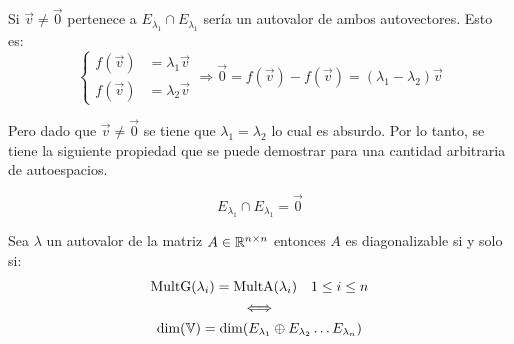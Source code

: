 Si $\Vec{v} \neq \Vec{0}$ pertenece a $E_{\lambda_1} \cap E_{\lambda_1}$ sería un autovalor de ambos autovectores.
Esto es:
\begin{equation*}
    \left\{
    \begin{aligned}
        f(\Vec{v}) &= \lambda_1 \Vec{v}
        \\
        f(\Vec{v}) &= \lambda_2 \Vec{v}
    \end{aligned}
    \right.
    \Rightarrow \Vec{0} = f(\Vec{v}) - f(\Vec{v}) = \left( \lambda_1-\lambda_2 \right) \Vec{v}
\end{equation*}

Pero dado que $\Vec{v}\neq\Vec{0}$ se tiene que $\lambda_1=\lambda_2$ lo cual es absurdo.
Por lo tanto, se tiene la siguiente propiedad que se puede demostrar para una cantidad arbitraria de autoespacios.

\begin{mdframed}[style=PropertyFrame]
    \begin{prop}
    \end{prop}
    \begin{equation*}
        E_{\lambda_1} \cap E_{\lambda_1} = \Vec{0}
    \end{equation*}
\end{mdframed}

\begin{mdframed}[style=PropertyFrame]
    \begin{prop}
    \end{prop}
    Sea $\lambda$ un autovalor de la matriz $A\in\mathbb{R}^{n\times n}$ entonces $A$ es diagonalizable si y solo si:
    \begin{gather*}
        \operatorname{MultG} (\lambda_i) = \operatorname{MultA} (\lambda_i) \quad 1\leq i\leq n
        \\
        \iff
        \\
        \operatorname{dim}(\mathbb{V}) = \operatorname{dim}(E_{\lambda_1} \oplus E_{\lambda_2} \dots E_{\lambda_n})
    \end{gather*}
\end{mdframed}
